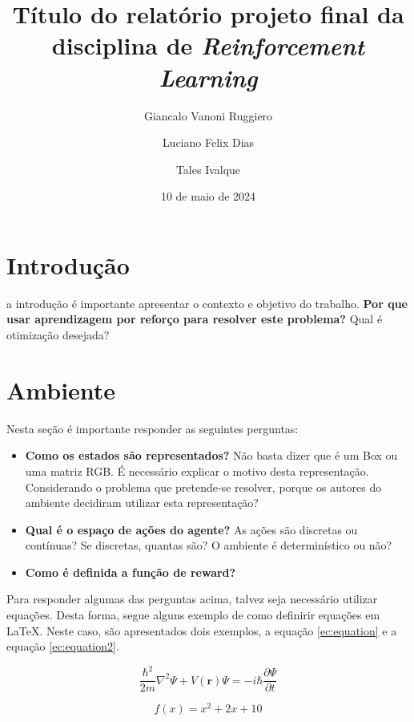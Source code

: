 \documentclass[9pt,a4paper,twoside]{tau}
\title{Título do relatório projeto final da disciplina de \textit{Reinforcement Learning}}
\author[a]{Giancalo Vanoni Ruggiero}
\author[a]{Luciano Felix Dias}
\author[b]{Tales Ivalque}
\affil[a]{Engenharia da Computação, INSPER}
\affil[b]{Engenharia Mecatrônica, INSPER}
\date{10 de maio de 2024}
\begin{document}
\maketitle
\thispagestyle{firststyle}
\tauabstract


\section{Introdução}

a introdução é importante apresentar o contexto e objetivo do trabalho. \textbf{Por que usar aprendizagem por reforço para resolver este problema?} Qual é otimização desejada?

\section{Ambiente}

Nesta seção é importante responder as seguintes perguntas:

\begin{itemize}
    \item \textbf{Como os estados são representados?} Não basta dizer que é um Box ou uma matriz RGB. É necessário explicar o motivo desta representação. Considerando o problema que pretende-se resolver, porque os autores do ambiente decidiram utilizar esta representação?
    \item \textbf{Qual é o espaço de ações do agente?} As ações são discretas ou contínuas? Se discretas, quantas são? O ambiente é determinístico ou não?
    \item \textbf{Como é definida a função de reward?}
\end{itemize}

Para responder algumas das perguntas acima, talvez seja necessário utilizar equações. Desta forma, segue alguns exemplo de como definirir equações em \LaTeX. Neste caso, são apresentados dois exemplos, a equação \ref{ec:equation} e a equação \ref{ec:equation2}.

\begin{equation} \label{ec:equation}
    \frac{\hbar^2}{2m}\nabla^2\Psi + V(\mathbf{r})\Psi = -i\hbar \frac{\partial\Psi}{\partial t}
\end{equation}

\begin{equation}\label{ec:equation2}
    f(x) = x^{2} +  2x + 10
\end{equation}
\end{document}
